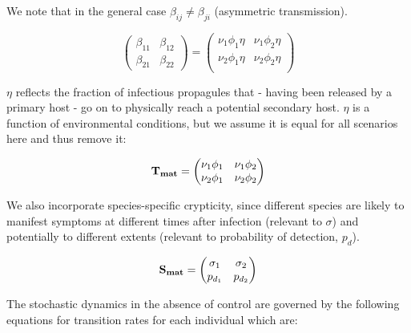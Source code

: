 \documentclass[prstpaper]{revtex4-2}
\begin{document}
We note that in the general case $\beta_{ij} \neq \beta_{ji}$ (asymmetric transmission).

\begin{equation}
    \begin{pmatrix}
\beta_{11} & \beta_{12} \\
\beta_{21} & \beta_{22}
 
\end{pmatrix} = 
\begin{pmatrix}
\nu_{1} \phi_{1} \eta & \nu_{1} \phi_{2} \eta \\
\nu_{2} \phi_{1} \eta & \nu_{2} \phi_{2} \eta \\
\end{pmatrix}
\end{equation}

$\eta$ reflects the fraction of infectious propagules that - having been released by a primary host - go on to physically reach a potential secondary host. $\eta$ is a function of environmental conditions, but we assume it is equal for all scenarios here and thus remove it: 

\begin{equation}
\label{nuphi}
   \bf{T_{mat}} = 
\begin{pmatrix}
\nu_{1} \phi_{1} & \nu_{1} \phi_{2} \\
\nu_{2} \phi_{1} & \nu_{2} \phi_{2} \\
\end{pmatrix}
\end{equation}

We also incorporate species-specific crypticity, since different species are likely to manifest symptoms at different times after infection (relevant to $\sigma$) and potentially to different extents (relevant to probability of detection, $p_d$). 

\begin{equation}
   \bf{S_{mat}} = 
\begin{pmatrix}
\sigma_{1} & \sigma_{2} \\
p_{d_{1}} & p_{d_{2}}\\
\end{pmatrix}
\end{equation}

The stochastic dynamics in the absence of control are governed by the following equations for transition rates for each individual which are:

\label{twospecies}
    
\end{document}
